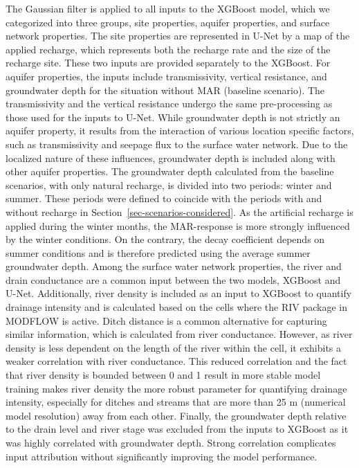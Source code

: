 \documentclass[
]{agujournal2019}
\begin{document}
The Gaussian filter is applied to all inputs to the XGBoost model, which
we categorized into three groups, site properties, aquifer properties,
and surface network properties. The site properties are represented in
U-Net by a map of the applied recharge, which represents both the
recharge rate and the size of the recharge site. These two inputs are
provided separately to the XGBoost. For aquifer properties, the inputs
include transmissivity, vertical resistance, and groundwater depth for
the situation without MAR (baseline scenario). The transmissivity and
the vertical resistance undergo the same pre-processing as those used
for the inputs to U-Net. While groundwater depth is not strictly an
aquifer property, it results from the interaction of various location
specific factors, such as transmissivity and seepage flux to the surface
water network. Due to the localized nature of these influences,
groundwater depth is included along with other aquifer properties. The
groundwater depth calculated from the baseline scenarios, with only
natural recharge, is divided into two periods: winter and summer. These
periods were defined to coincide with the periods with and without
recharge in Section~\ref{sec-scenarios-considered}. As the artificial
recharge is applied during the winter months, the MAR-response is more
strongly influenced by the winter conditions. On the contrary, the decay
coefficient depends on summer conditions and is therefore predicted
using the average summer groundwater depth. Among the surface water
network properties, the river and drain conductance are a common input
between the two models, XGBoost and U-Net. Additionally, river density
is included as an input to XGBoost to quantify drainage intensity and is
calculated based on the cells where the RIV package in MODFLOW is
active. Ditch distance is a common alternative for capturing similar
information, which is calculated from river conductance. However, as
river density is less dependent on the length of the river within the
cell, it exhibits a weaker correlation with river conductance. This
reduced correlation and the fact that river density is bounded between 0
and 1 result in more stable model training makes river density the more
robust parameter for quantifying drainage intensity, especially for
ditches and streams that are more than 25 m (numerical model resolution)
away from each other. Finally, the groundwater depth relative to the
drain level and river stage was excluded from the inputs to XGBoost as
it was highly correlated with groundwater depth. Strong correlation
complicates input attribution without significantly improving the model
performance.
\end{document}
